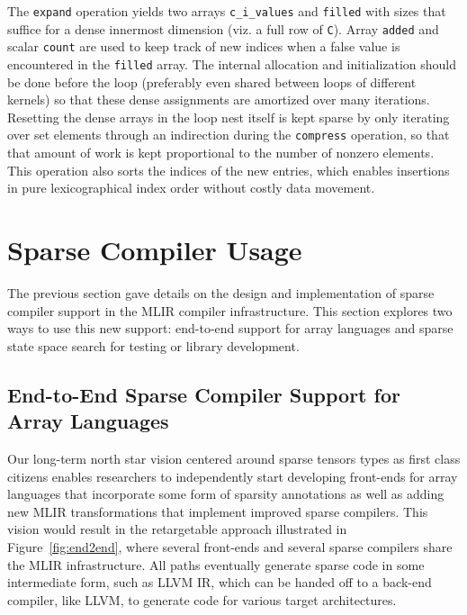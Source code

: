 \documentclass[10pt]{article}
\begin{document}
The \texttt{expand} operation yields two arrays \texttt{c\_i\_values} and \texttt{filled} with sizes that suffice for a dense innermost dimension (viz. a full row of \texttt{C}). Array \texttt{added} and scalar \texttt{count} are used to keep track of new indices when a false value is encountered in the \texttt{filled} array. The internal allocation and initialization should be done before the loop (preferably even shared between loops of different kernels) so that these dense assignments are amortized over many iterations. Resetting the dense arrays in the loop nest itself is kept sparse by only iterating over set elements through an indirection during the \texttt{compress} operation, so that that amount of work is kept proportional to the number of nonzero elements. This operation also sorts the indices of the new entries, which enables insertions in pure lexicographical index order without costly data movement. 

\section{Sparse Compiler Usage}
\label{moda}

The previous section gave details on the design and implementation of sparse compiler support in the MLIR compiler infrastructure. This section explores two ways to use this new support: end-to-end support for array languages and sparse state space search for testing or library development.

\subsection{End-to-End Sparse Compiler Support for Array Languages}

Our long-term north star vision centered around sparse tensors types as first class citizens enables researchers to independently start developing front-ends for array languages that incorporate some form of sparsity annotations as well as adding new MLIR transformations that implement improved sparse compilers. This vision would result in the retargetable approach illustrated in Figure~\ref{fig:end2end}, where several front-ends and several sparse compilers share the MLIR infrastructure. All paths eventually generate sparse code in some intermediate form, such as LLVM IR, which can be handed off to a back-end compiler, like LLVM, to generate code for various target architectures.
\end{document}
